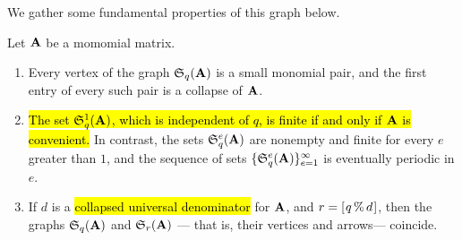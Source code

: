 \documentclass{article}
\begin{document}
We gather some fundamental properties of this graph below.

\begin{proposition}
   \label{elementary1: P}
   Let $\mathbf{A}$ be a momomial matrix.
\begin{enumerate}[$(1)$]

\item \label{elementary1 small pairs} 
Every vertex of the graph $\mathfrak{S}_{q}(\mathbf{A})$ is a small monomial pair, and the first entry of every such pair is a collapse of $\mathbf{A}$. 

\item \label{elementary1 periodic in e}
\hl{The set $\mathfrak{S}_{q}^1(\mathbf{A})$, which is independent of $q$, is finite if and only if $\mathbf{A}$ is convenient.}  In contrast, the sets $\mathfrak{S}_{q}^e(\mathbf{A})$ are nonempty and finite for every $e$ greater than $1$, and the sequence of sets $\{ \mathfrak{S}_{q}^e(\mathbf{A}) \}_{e=1}^{\infty}$ is eventually periodic in $e$.

\item \label{elementary1 periodic in r}
If $d$ is a \hl{collapsed universal denominator} for $\mathbf{A}$, and $r= [ \hspace{.01in} q \, \% \, d \hspace{.01in} ]$, then the graphs $\mathfrak{S}_{q}(\mathbf{A})$ and $\mathfrak{S}_r(\mathbf{A})$ --- that is, their vertices {and} arrows--- coincide.
\end{enumerate}
\end{proposition}
\end{document}
